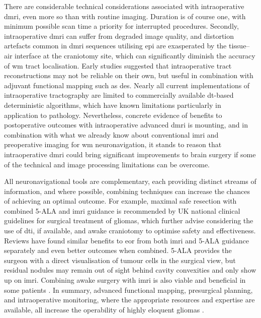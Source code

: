There are considerable technical considerations associated with intraoperative \gls{dmri}, even more so than with routine imaging.
Duration is of course one, with minimum possible scan time a priority for interrupted procedures.
Secondly, intraoperative \gls{dmri} can suffer from degraded image quality\autocite{Roder2019}, and distortion artefacts common in \gls{dmri} sequences utilising \gls{epi} are exasperated by the tissue--air interface at the craniotomy site\autocite{Elliott2020}, which can significantly diminish the accuracy of \gls{wm} tract localisation\autocite{Yang2022}.
Early studies suggested that intraoperative tract reconstructions may not be reliable on their own, but useful in combination with adjuvant functional mapping such as \gls{des}\autocite{Ostry2013}.
Nearly all current implementations of intraoperative tractography are limited to commercially available \gls{dt}-based deterministic algorithms, which have known limitations particularly in application to pathology.
Nevertheless, concrete evidence of benefits to postoperative outcomes with intraoperative advanced \gls{dmri} is mounting\autocite{DAndrea2012,Cui2015,Maesawa2010}, and in combination with what we already know about conventional \gls{imri} and preoperative imaging for \gls{wm} neuronavigation, it stands to reason that intraoperative \gls{dmri} could bring significant improvements to brain surgery if some of the technical and image processing limitations can be overcome.

All neuronavigational tools are complementary, each providing distinct streams of information, and where possible, combining techniques can increase the chances of achieving an optimal outcome.
For example, maximal safe resection with combined 5-ALA and \gls{imri} guidance is recommended by UK national clinical guidelines for surgical treatment of gliomas, which further advise considering the use of \gls{dti}, if available, and awake craniotomy to optimise safety and effectiveness\autocite{NICE2021}.
Reviews have found similar benefits to \gls{eor} from both \gls{imri} and 5-ALA guidance separately\autocite{Golub2020} and even better outcomes when combined\autocite{Nickel2018,Coburger2019}.
5-ALA provides the surgeon with a direct visualisation of tumour cells in the surgical view, but residual nodules may remain out of sight behind cavity convexities and only show up on \gls{imri}\autocite{SueroMolina2019}.
Combining awake surgery with \gls{imri} is also viable and beneficial in some patients \autocite{Motomura2017,Tuleasca2021}.
In summary, advanced functional mapping, presurgical planning, and intraoperative monitoring, where the appropriate resources and expertise are available\autocite{GeorgeZakiGhali2020}, all increase the operability of highly eloquent gliomas
\autocite{Bello2008,Krieg2013,DellaPuppa2013b,Magill2018}.
